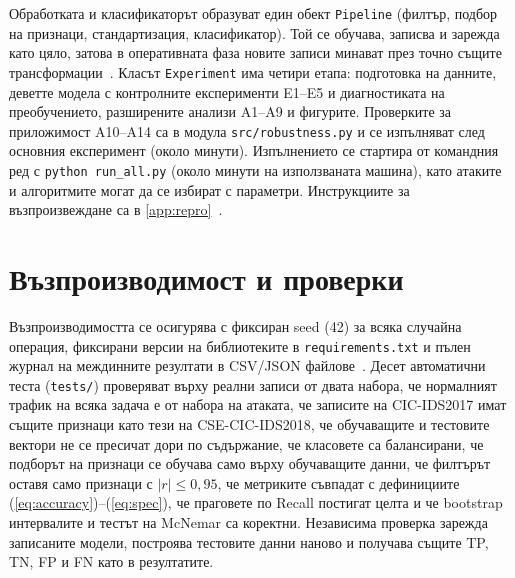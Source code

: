 Обработката и класификаторът образуват един обект \texttt{Pipeline} (филтър, подбор на признаци, стандартизация, класификатор). Той се обучава, записва и зарежда като цяло, затова в оперативната фаза новите записи минават през точно същите трансформации~\cite{pedregosa2011}. Класът \texttt{Experiment} има четири етапа: подготовка на данните, деветте модела с контролните експерименти E1--E5 и диагностиката на преобучението, разширените анализи A1--A9 и фигурите. Проверките за приложимост A10--A14 са в модула \texttt{src/robustness.py} и се изпълняват след основния експеримент (около  минути). Изпълнението се стартира от командния ред с \texttt{python run\_all.py} (около  минути на използваната машина), като атаките и алгоритмите могат да се избират с параметри. Инструкциите за възпроизвеждане са в \cref{app:repro}~\cite{repo}.

\section{Възпроизводимост и проверки}
Възпроизводимостта се осигурява с фиксиран seed (42) за всяка случайна операция, фиксирани версии на библиотеките в \texttt{requirements.txt} и пълен журнал на междинните резултати в CSV/JSON файлове~\cite{arp2022}. Десет автоматични теста (\texttt{tests/}) проверяват върху реални записи от двата набора, че нормалният трафик на всяка задача е от набора на атаката, че записите на CIC-IDS2017 имат същите признаци като тези на CSE-CIC-IDS2018, че обучаващите и тестовите вектори не се пресичат дори по съдържание, че класовете са балансирани, че подборът на признаци се обучава само върху обучаващите данни, че филтърът оставя само признаци с $|r|\le0{,}95$, че метриките съвпадат с дефинициите (\ref{eq:accuracy})--(\ref{eq:spec}), че праговете по Recall постигат целта и че bootstrap интервалите и тестът на McNemar са коректни. Независима проверка зарежда записаните модели, построява тестовите данни наново и получава същите TP, TN, FP и FN като в резултатите.
